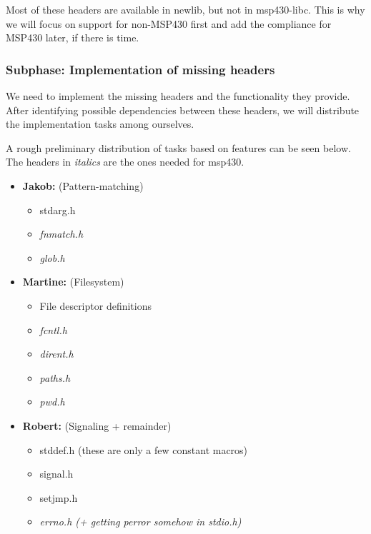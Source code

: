 \documentclass[11pt,
  a4paper,
  BCOR=7mm
]{scrartcl}
\begin{document}
Most of these headers are available in newlib, but not in msp430-libc.
This is why we will focus on support for non-MSP430 first and add the compliance
for MSP430 later, if there is time.

\subsubsection*{Subphase: Implementation of missing headers}
\label{ssub:headers_implementation}
We need to implement the missing headers and the functionality they
provide. After identifying possible dependencies between these headers,
we will distribute the implementation tasks among ourselves.

\pagebreak

A rough preliminary distribution of tasks based on features can be seen below. 
The headers in \emph{italics} are the ones needed for msp430.

\begin{itemize}
    \item   \textbf{Jakob:} (Pattern-matching)
            \begin{itemize}
                \item   stdarg.h
                \item   \emph{fnmatch.h}
                \item   \emph{glob.h}
            \end{itemize}
    \item   \textbf{Martine:} (Filesystem)
            \begin{itemize}
                \item   File descriptor definitions
                \item   \emph{fcntl.h}
                \item   \emph{dirent.h}
                \item   \emph{paths.h}
                \item   \emph{pwd.h}
            \end{itemize}
    \item   \textbf{Robert:} (Signaling + remainder)
            \begin{itemize}
                \item   stddef.h (these are only a few constant macros)
                \item   signal.h
                \item   setjmp.h
                \item   \emph{errno.h (+ getting perror somehow in stdio.h)}
            \end{itemize}
\end{itemize}
\end{document}
